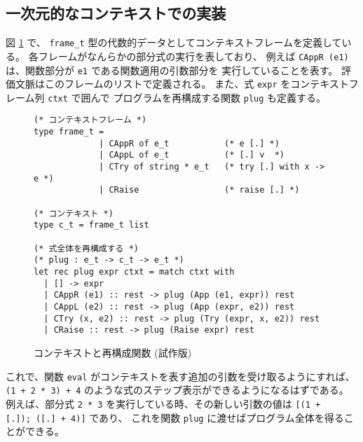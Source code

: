\subsection{一次元的なコンテキストでの実装}
\label{subsection:stepper__before}

図 \ref{figure:simpleplug} で、 \texttt{frame\_t} 型の代数的データとしてコンテキストフレームを定義している。
各フレームがなんらかの部分式の実行を表しており、
例えば \texttt{CAppR (e1)} は、関数部分が \texttt{e1} である関数適用の引数部分を
実行していることを表す。
評価文脈はこのフレームのリストで定義される。
また、式 \texttt{expr} をコンテキストフレーム列 \texttt{ctxt} で囲んで
プログラムを再構成する関数 \texttt{plug} も定義する。

\begin{figure}
\begin{spacing}{0.8}
\begin{verbatim}
(* コンテキストフレーム *)
type frame_t = 
             | CAppR of e_t           (* e [.] *)
             | CAppL of e_t           (* [.] v  *)
             | CTry of string * e_t   (* try [.] with x -> e *)
             | CRaise                 (* raise [.] *)

(* コンテキスト *)
type c_t = frame_t list

(* 式全体を再構成する *)
(* plug : e_t -> c_t -> e_t *)
let rec plug expr ctxt = match ctxt with
  | [] -> expr
  | CAppR (e1) :: rest -> plug (App (e1, expr)) rest
  | CAppL (e2) :: rest -> plug (App (expr, e2)) rest
  | CTry (x, e2) :: rest -> plug (Try (expr, x, e2)) rest
  | CRaise :: rest -> plug (Raise expr) rest
\end{verbatim}
\end{spacing}
\caption{コンテキストと再構成関数 (試作版)}
\label{figure:simpleplug}
\end{figure}

これで、関数 \texttt{eval} がコンテキストを表す追加の引数を受け取るようにすれば、
\texttt{(1 + 2 * 3) + 4} のような式のステップ表示ができるようになるはずである。
例えば、部分式 \texttt{2 * 3} を実行している時、その新しい引数の値は
\texttt{[(1 + [.]);\ ([.]\ + 4)]} であり、
これを関数 \texttt{plug} に渡せばプログラム全体を得ることができる。

